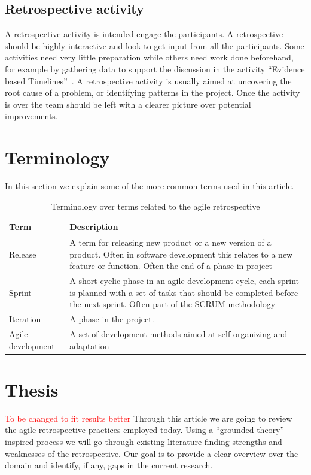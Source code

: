 \documentclass[12pt]{article}
\newcommand\todo[1]{\textcolor{red}{#1}}
\begin{document}
\subsection{Retrospective activity}
A retrospective activity is intended engage the participants. A retrospective should be highly interactive and look to get input from all the participants. Some activities need very little preparation while others need work done beforehand, for example by gathering data to support the discussion in the activity ``Evidence based Timelines''~\cite{Bjarnason2012}. A retrospective activity is usually aimed at uncovering the root cause of a problem, or identifying patterns in the project. Once the activity is over the team should be left with a clearer picture over potential improvements.

\section{Terminology}
In this section we explain some of the more common terms used in this article. 

\begin{table}[!h]
	\begin{center}
	\caption{Terminology over terms related to the agile retrospective}
	\label{table:terminology}
	\begin{tabular}{| l | p{}}
	\hline
	Term & Description \\
	\hline
	Release & A term for releasing  new product or a new version of a product. Often in software development this relates to a new feature or function. Often the end of a phase in project \\
	Sprint & A short cyclic phase in an agile development cycle, each sprint is planned with a set of tasks that should be completed before the next sprint. Often part of the SCRUM methodology \\
	Iteration & A phase in the project. \\
	Agile development & A set of development methods aimed at self organizing and adaptation \\
	\hline
	\end{tabular}
\end{center}
\end{table}

\section{Thesis}
\todo{To be changed to fit results better}
Through this article we are going to review the agile retrospective practices employed today. Using a ``grounded-theory'' inspired process we will go through existing literature finding strengths and weaknesses of the retrospective. Our goal is to provide a clear overview over the domain and identify, if any, gaps in the current research. 
\end{document}
